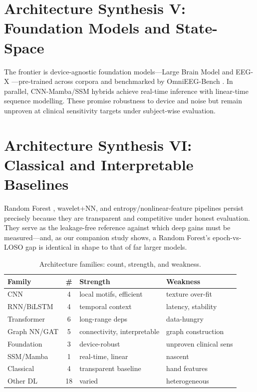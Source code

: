 \documentclass[10pt,journal,twocolumn]{IEEEtran}
\begin{document}
\section{Architecture Synthesis V: Foundation Models and State-Space}
The frontier is device-agnostic foundation models---Large Brain Model and EEG-X \citep{ep251108861}---pre-trained across corpora and benchmarked by OmniEEG-Bench \citep{ep260600815}. In parallel, CNN-Mamba/SSM hybrids \citep{ep260113234} achieve real-time inference with linear-time sequence modelling. These promise robustness to device and noise but remain unproven at clinical sensitivity targets under subject-wise evaluation.

\section{Architecture Synthesis VI: Classical and Interpretable Baselines}
Random Forest \citep{ep210604510}, wavelet+NN, and entropy/nonlinear-feature pipelines persist precisely because they are transparent and competitive under honest evaluation. They serve as the leakage-free reference against which deep gains must be measured---and, as our companion study shows, a Random Forest's epoch-vs-LOSO gap is identical in shape to that of far larger models.

\begin{table}[h]\centering\caption{Architecture families: count, strength, and weakness.}\label{tab:archsum}
\footnotesize\begin{tabular}{lcll}\toprule
Family & \# & Strength & Weakness\\\midrule
CNN & 4 & local motifs, efficient & texture over-fit\\
RNN/BiLSTM & 4 & temporal context & latency, stability\\
Transformer & 6 & long-range deps & data-hungry\\
Graph NN/GAT & 5 & connectivity, interpretable & graph construction\\
Foundation & 3 & device-robust & unproven clinical sens\\
SSM/Mamba & 1 & real-time, linear & nascent\\
Classical & 4 & transparent baseline & hand features\\
Other DL & 18 & varied & heterogeneous\\\bottomrule
\end{tabular}\end{table}
\end{document}

